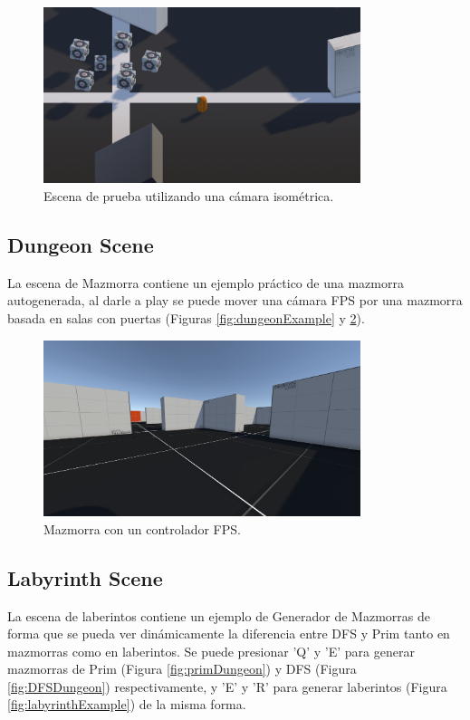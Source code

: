 \begin{figure}[H]
   \centering
     \includegraphics[width=350px,clip=true]{3DISometric.png}
   \caption{Escena de prueba utilizando una cámara isométrica.}
   \label{fig:isoGame}
\end{figure}

\subsection{Dungeon Scene}
La escena de Mazmorra contiene un ejemplo práctico de una mazmorra autogenerada, al darle a play se puede mover una cámara FPS por una mazmorra
 basada en salas con puertas (Figuras \ref{fig:dungeonExample} y \ref{fig:fpsDungeon}).

\begin{figure}[H]
   \centering
     \includegraphics[width=350px,clip=true]{3DFPSDungeonTestScene.png}
   \caption{Mazmorra con un controlador FPS.}
   \label{fig:fpsDungeon}
 \end{figure}

\subsection{Labyrinth Scene}
La escena de laberintos contiene un ejemplo de Generador de Mazmorras de forma que se pueda ver dinámicamente la diferencia entre DFS y Prim tanto en mazmorras como en laberintos.  Se puede presionar
 'Q' y 'E' para generar mazmorras de Prim (Figura \ref{fig:primDungeon}) y DFS (Figura \ref{fig:DFSDungeon}) respectivamente, y 'E' y 'R' para generar laberintos (Figura \ref{fig:labyrinthExample}) de la misma forma.
 
